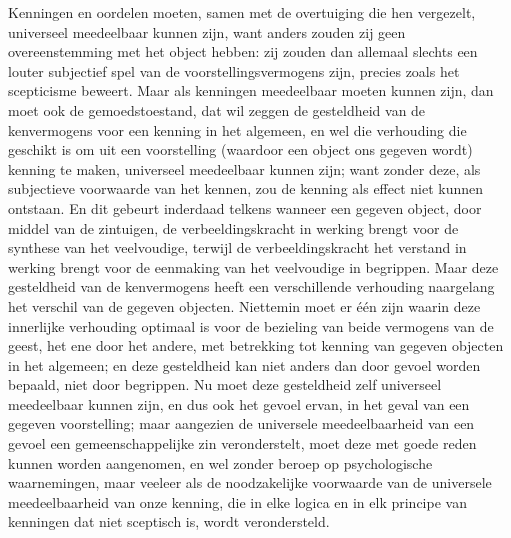 Kenningen en oordelen moeten, samen met de overtuiging die hen vergezelt, universeel meedeelbaar kunnen zijn, want anders zouden zij geen overeenstemming met het object hebben: zij zouden dan allemaal slechts een louter subjectief spel van de voorstellingsvermogens zijn, precies zoals het scepticisme beweert. Maar als kenningen meedeelbaar moeten kunnen zijn, dan moet ook de gemoedstoestand, dat wil zeggen de gesteldheid van de kenvermogens voor een kenning in het algemeen, en wel die verhouding die geschikt is om uit een voorstelling (waardoor een object ons gegeven wordt) kenning te maken, universeel meedeelbaar kunnen zijn; want zonder deze, als subjectieve voorwaarde van het kennen, zou de kenning als effect niet kunnen ontstaan. En dit gebeurt inderdaad telkens wanneer een gegeven object, door middel van de zintuigen, de verbeeldingskracht in werking brengt voor de synthese van het veelvoudige, terwijl de verbeeldingskracht het verstand in werking brengt voor de eenmaking van het veelvoudige in begrippen. Maar deze gesteldheid van de kenvermogens heeft een verschillende verhouding naargelang het verschil van de gegeven objecten. Niettemin moet er één zijn waarin deze innerlijke verhouding optimaal is voor de bezieling van beide vermogens van de geest, het ene door het andere, met betrekking tot kenning van gegeven objecten in het algemeen; en deze gesteldheid kan niet anders dan door gevoel worden bepaald, niet door begrippen. Nu moet deze gesteldheid zelf universeel meedeelbaar kunnen zijn, en dus ook het gevoel ervan, in het geval van een gegeven voorstelling; maar aangezien de universele meedeelbaarheid van een gevoel een gemeenschappelijke zin veronderstelt, moet deze met goede reden kunnen worden aangenomen, en wel zonder beroep op psychologische waarnemingen, maar veeleer als de noodzakelijke voorwaarde van de universele meedeelbaarheid van onze kenning, die in elke logica en in elk principe van kenningen dat niet sceptisch is, wordt verondersteld.

